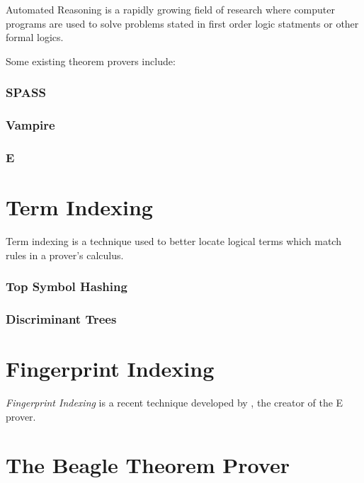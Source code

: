 Automated Reasoning is a rapidly growing field of research where computer programs
are used to solve problems stated in first order logic statments or other formal logics.

Some existing theorem provers include:

\subsubsection*{SPASS}
\cite{spass}

\subsubsection*{Vampire}
\cite{vampire}

\subsubsection*{E}
\cite{eprover}


\section{Term Indexing}
\label{sec:indexing}

Term indexing is a technique used to better locate logical terms which match rules
in a prover's calculus.

\subsubsection*{Top Symbol Hashing}

\subsubsection*{Discriminant Trees}


\section{Fingerprint Indexing}
\label{sec:fingerprint}

\emph{Fingerprint Indexing} is a recent technique developed by , the creator
of the E prover.

\section{The Beagle Theorem Prover}
\label{sec:beagle}

